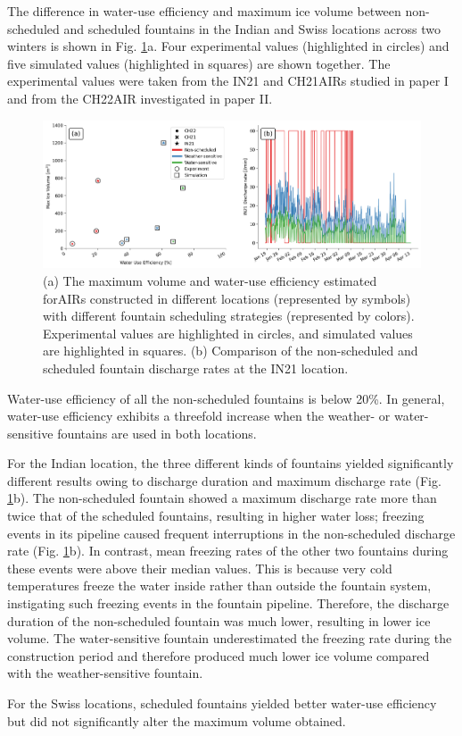 The difference in water-use efficiency and maximum ice volume between non-scheduled and scheduled fountains in the
Indian and Swiss locations across two winters is shown in Fig. \ref{fig:wue}a. Four experimental values
(highlighted in circles) and five simulated values (highlighted in squares) are shown together. The
experimental values were taken from the IN21 and CH21\ac{AIRs} studied in paper I and from the CH22\ac{AIR} investigated in
paper II.

\begin{figure}[htb]
	\includegraphics[width=\textwidth]{figs/wue.png}

	\caption{(a) The maximum volume and water-use efficiency estimated for\ac{AIRs} constructed in different locations
		(represented by symbols) with different fountain scheduling strategies (represented by colors). Experimental
		values are highlighted in circles, and simulated values are highlighted in squares. (b) Comparison of
		the non-scheduled and scheduled fountain discharge rates at the IN21 location.}

	\label{fig:wue}
\end{figure}

Water-use efficiency of all the non-scheduled fountains is below 20\%. In general, water-use efficiency
exhibits a threefold increase when the weather- or water-sensitive fountains are used in both
locations.

For the Indian location, the three different kinds of fountains yielded significantly different results owing to discharge
duration and maximum discharge rate
(Fig. \ref{fig:wue}b). The non-scheduled fountain showed a maximum discharge rate more than twice that of
the scheduled fountains, resulting in higher water loss; freezing events in its pipeline caused frequent
interruptions in the non-scheduled discharge rate (Fig. \ref{fig:wue}b). In contrast, mean freezing
rates of the other two fountains during these events were above their median values. This is because very cold
temperatures freeze the water inside rather than outside the fountain system, instigating such freezing events in
the fountain pipeline. Therefore, the discharge duration of the non-scheduled fountain was much lower, resulting in
lower ice volume. The water-sensitive fountain underestimated the freezing rate during the construction period
and therefore produced much lower ice volume compared with the weather-sensitive fountain.

For the Swiss locations, scheduled fountains yielded better water-use efficiency but did not significantly alter
the maximum volume obtained.

